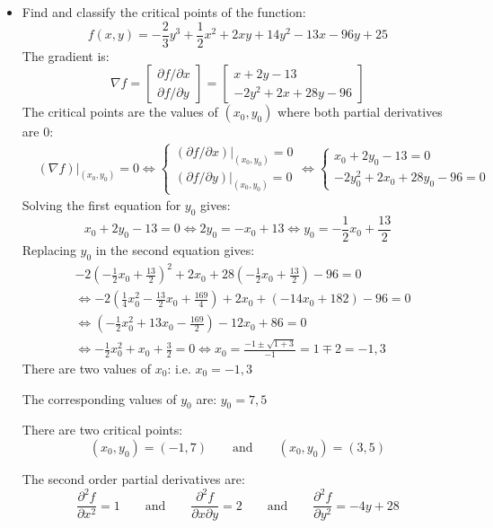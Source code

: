 \documentclass{article}
\begin{document}
\begin{itemize}
\item Find and classify the critical points of the function:
\[f(x,y) = -\frac{2}{3}y^3 + \frac{1}{2}x^2 + 2xy + 14y^2 - 13x - 96y + 25\]
The gradient is:
\[\nabla f = \begin{bmatrix} \partial f/\partial x \\ \partial f/\partial y \end{bmatrix} = \begin{bmatrix} x + 2y - 13 \\ -2y^2 + 2x + 28y - 96 \end{bmatrix}\]
The critical points are the values of \((x_0, y_0)\) where both partial derivatives are \(0\):
\begin{align*}
& (\nabla f)\Big|_{(x_0, y_0)} = 0 
\iff \left\{\begin{array}{c} (\partial f/\partial x)|_{(x_0, y_0)} = 0 \\ (\partial f/\partial y)|_{(x_0, y_0)} = 0 \end{array}\right. 
\iff \left\{\begin{array}{c} x_0 + 2y_0 - 13 = 0 \\ -2y_0^2 + 2x_0 + 28y_0 - 96 = 0 \end{array}\right. 
\end{align*}
Solving the first equation for \(y_0\) gives: 
\[x_0 + 2y_0 - 13 = 0 \iff 2y_0 = -x_0 + 13 \iff y_0 = -\frac{1}{2}x_0 + \frac{13}{2}\]
Replacing \(y_0\) in the second equation gives:
\begin{align*} 
& -2(-\frac{1}{2}x_0 + \frac{13}{2})^2 + 2x_0 + 28(-\frac{1}{2}x_0 + \frac{13}{2}) - 96 = 0 \\  
& \iff -2(\frac{1}{4}x_0^2 - \frac{13}{2}x_0 + \frac{169}{4}) + 2x_0 + (-14x_0 + 182) - 96 = 0 \\
& \iff (-\frac{1}{2}x_0^2 + 13x_0 - \frac{169}{2}) - 12x_0 + 86 = 0 \\ 
& \iff -\frac{1}{2}x_0^2 + x_0 + \frac{3}{2}  = 0  
\iff x_0 = \frac{-1 \pm \sqrt{1 + 3}}{-1} = 1 \mp 2 = -1, 3
\end{align*}  
There are two values of \(x_0\): i.e. \(x_0 = -1, 3\)

The corresponding values of \(y_0\) are: \(y_0 = 7, 5\) 

There are two critical points:
\[(x_0, y_0) = (-1, 7) \quad\quad\text{and}\quad\quad (x_0, y_0) = (3, 5)\]

The second order partial derivatives are:
\[\frac{\partial^2 f}{\partial x^2} = 1 \quad\quad\text{and}\quad\quad \frac{\partial^2 f}{\partial x \partial y} = 2 \quad\quad\text{and}\quad\quad \frac{\partial^2 f}{\partial y^2} = -4y + 28\] 


\end{itemize}
\end{document}
